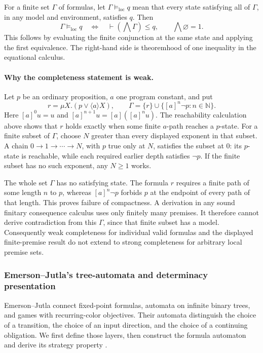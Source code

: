 For a finite set \(\Gamma\) of formulas, let
\(\Gamma\models_{\mathrm{loc}}q\) mean that every state satisfying
all of \(\Gamma\), in any model and environment, satisfies \(q\).
Then
\[
 \Gamma\models_{\mathrm{loc}}q
 \quad\Longleftrightarrow\quad
 \vdash\left(\bigwedge\Gamma\right)\leq q,
 \qquad \bigwedge\varnothing=1.
\]
This follows by evaluating the finite conjunction at the same state
and applying the first equivalence.  The right-hand side is
theoremhood of one inequality in the equational calculus.

\paragraph{Why the completeness statement is weak.}
Let \(p\) be an ordinary proposition, \(a\) one program constant,
and put
\[
 r=\mu X.(p\lor\langle a\rangle X),\qquad
 \Gamma=\{r\}\cup\{[a]^n\neg p:n\in\mathbb N\}.
\]
Here \([a]^0u=u\) and \([a]^{n+1}u=[a]([a]^nu)\).
The reachability calculation above shows that \(r\) holds exactly
when some finite \(a\)-path reaches a \(p\)-state.
For a finite subset of \(\Gamma\), choose \(N\) greater than every
displayed exponent in that subset.  A chain
\(0\to1\to\cdots\to N\), with \(p\) true only at \(N\),
satisfies the subset at \(0\): its \(p\)-state is reachable, while
each required earlier depth satisfies \(\neg p\).
If the finite subset has no such exponent, any \(N\geq1\) works.

The whole set \(\Gamma\) has no satisfying state.  The formula \(r\)
requires a finite path of some length \(n\) to \(p\), whereas
\([a]^n\neg p\) forbids \(p\) at the endpoint of every path of that
length.  This proves failure of compactness.
A derivation in any sound finitary consequence calculus uses only
finitely many premises.  It therefore cannot derive contradiction
from this \(\Gamma\), since that finite subset has a model.
Consequently weak completeness for individual valid formulas and
the displayed finite-premise result do not extend to strong
completeness for arbitrary local premise sets.

\subsubsection{Emerson--Jutla's tree-automata and determinacy presentation}
\label{sec:p09-presentation-n-c-018-emerson-jutla}

Emerson--Jutla connect fixed-point formulas, automata on infinite binary
trees, and games with recurring-color objectives. Their automata distinguish
the choice of a transition, the choice of an input direction, and the choice
of a continuing obligation. We first define those layers, then construct
the formula automaton and derive its strategy property
\cite[\S\S2--4]{EmersonJutla1991}.

